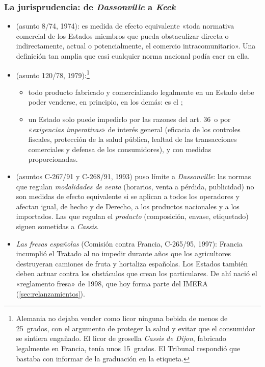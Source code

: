 \documentclass[11pt]{article}
\begin{document}
\subsubsection{La jurisprudencia: de \emph{Dassonville} a \emph{Keck}}\label{sec:jurisprudencia-bienes}

\begin{itemize}
\item \emph{} (asunto 8/74, 1974): es medida de efecto equivalente «toda normativa comercial de los Estados miembros que pueda obstaculizar directa o indirectamente, actual o potencialmente, el comercio intracomunitario». Una definición tan amplia que casi cualquier norma nacional podía caer en ella.
\item \emph{} (asunto 120/78, 1979):\footnote{Alemania no dejaba vender como licor ninguna bebida de menos de 25~grados, con el argumento de proteger la salud y evitar que el consumidor se sintiera engañado. El licor de grosella \emph{Cassis de Dijon}, fabricado legalmente en Francia, tenía unos 15~grados. El Tribunal respondió que bastaba con informar de la graduación en la etiqueta.}
  \begin{itemize}
  \item todo producto fabricado y comercializado legalmente en un Estado debe poder venderse, en principio, en los demás: es el ;
  \item un Estado solo puede impedirlo por las razones del art. 36~o por «\emph{exigencias imperativas}» de interés general (eficacia de los controles fiscales, protección de la salud pública, lealtad de las transacciones comerciales y defensa de los consumidores), y con medidas proporcionadas.
  \end{itemize}
\item \emph{} (asuntos C-267/91 y C-268/91, 1993) puso límite a \emph{Dassonville}: las normas que regulan \emph{modalidades de venta} (horarios, venta a pérdida, publicidad) no son medidas de efecto equivalente si se aplican a todos los operadores y afectan igual, de hecho y de Derecho, a los productos nacionales y a los importados. Las que regulan el \emph{producto} (composición, envase, etiquetado) siguen sometidas a \emph{Cassis}.
\item \emph{Las fresas españolas} (Comisión contra Francia, C-265/95, 1997): Francia incumplió el Tratado al no impedir durante años que los agricultores destruyeran camiones de fruta y hortaliza españolas. Los Estados también deben actuar contra los obstáculos que crean los particulares. De ahí nació el «reglamento fresa» de 1998, que hoy forma parte del IMERA (\ref{sec:relanzamientos}).
\end{itemize}
\end{document}
